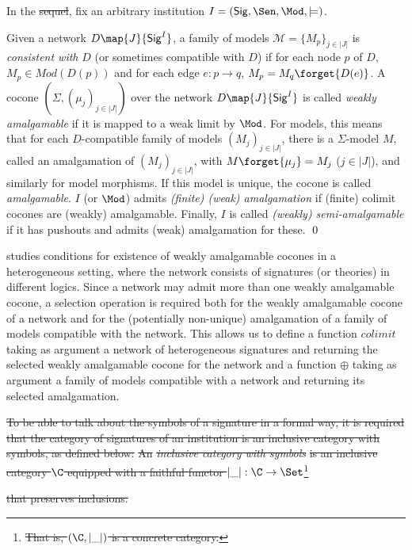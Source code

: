 \documentclass[10pt,fleqn,final]{scrreprt}
\newcommand{\Sig}{\mathsf{Sig}}
\newenvironment{definitions}[0]{\medskip }{}
\providecommand{\DIFadd}[1]{{\protect\color{blue}\uwave{#1}}} %
\providecommand{\DIFdel}[1]{{\protect\color{red}\sout{#1}}}                      %
\providecommand{\DIFaddbegin}{} %
\providecommand{\DIFaddend}{} %
\providecommand{\DIFdelbegin}{} %
\providecommand{\DIFdelend}{} %
\begin{document}
\begin{definitions}
In the \DIFdelbegin \DIFdel{sequel}\DIFdelend \DIFaddbegin \DIFadd{following}\DIFaddend , fix an arbitrary institution
$I=(\Sig,\Sen,\Mod,\models)$.  

\begin{definition}
Given a network $D\map{J}{\Sig^I}$, 
a family of models $\mathcal{M} = \{M_p\}_{j\in |J|}$ is
\emph{consistent with} $D$ (or sometimes compatible with $D$) 
if for each node $p$ of $D$, $M_p \in Mod(D(p))$ and
for each edge $e:p\rightarrow q$, $M_p = M_q\forget{D(e)}$.
  A cocone
$(\Sigma,(\mu_j)_{j\in|J|})$ over the network $D\map{J}{\Sig^I}$ is
called \emph{weakly amalgamable} if it is mapped to a weak limit by $\Mod$.
For models, this means that for each $D$-compatible family of
models $(M_j)_{j\in|J|}$, there is a $\Sigma$-model $M$, called an amalgamation of 
 $(M_j)_{j\in|J|}$,
with
$M\forget{\mu_j}=M_j$ ($j\in|J|$), and similarly for model morphisms.
 If this model is unique, the cocone
is called \emph{amalgamable}. 
$I$ (or $\Mod$) admits \emph{(finite) (weak)
amalgamation} if (finite) colimit cocones are (weakly) amalgamable.
Finally, $I$ is called \emph{(weakly) semi-amalgamable} if 
it has pushouts and admits (weak) amalgamation for these.
\qed\end{definition}

\cite{weakcol} studies conditions for existence of weakly amalgamable cocones
in a heterogeneous setting, where the network consists of signatures (or theories)
in different logics. Since a network may admit more than one weakly amalgamable cocone,
a selection operation is required both for the weakly amalgamable cocone of a network 
and for the (potentially non-unique) amalgamation of a family of models compatible with the
network. This allows us to define a function
$colimit$ taking as argument a network of heterogeneous signatures and
returning the selected weakly amalgamable cocone for the network and
a function $\oplus$ taking as argument a family of models compatible with a network
and returning its selected amalgamation.

\DIFdelbegin \DIFdel{To be able to talk about the symbols of a signature in a formal way, it is required that the category of signatures of an institution is 
an inclusive category with symbols, as defined below:
}%
\DIFdel{An }\emph{\DIFdel{inclusive category with symbols}} %
\DIFdel{is an inclusive category
$\C$ equipped with a faithful functor $|\_|:\C\to\Set$}\footnote{\DIFdel{That is,
$(\C,|\_|)$ is a concrete category.}} %
\addtocounter{footnote}{-1}%
\DIFdel{that preserves
inclusions.
}%


\end{definitions}
\end{document}
